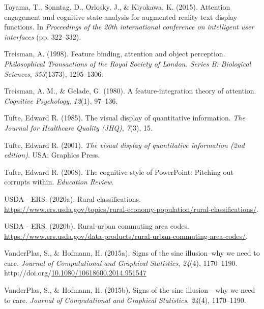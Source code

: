 \documentclass[print]{nuthesis}
\newlength{\cslhangindent}
\newenvironment{CSLReferences}[2]%
{\setlength{\parindent}{0pt}%
\everypar{\setlength{\hangindent}{\cslhangindent}}\ignorespaces}%
{\par}
\begin{document}
\begin{CSLReferences}{1}{0}
\leavevmode{}%
Toyama, T., Sonntag, D., Orlosky, J., \& Kiyokawa, K. (2015). Attention engagement and cognitive state analysis for augmented reality text display functions. In \emph{Proceedings of the 20th international conference on intelligent user interfaces} (pp. 322--332).

\leavevmode{}%
Treisman, A. (1998). Feature binding, attention and object perception. \emph{Philosophical Transactions of the Royal Society of London. Series B: Biological Sciences}, \emph{353}(1373), 1295--1306.

\leavevmode{}%
Treisman, A. M., \& Gelade, G. (1980). A feature-integration theory of attention. \emph{Cognitive Psychology}, \emph{12}(1), 97--136.

\leavevmode{}%
Tufte, Edward R. (1985). The visual display of quantitative information. \emph{The Journal for Healthcare Quality (JHQ)}, \emph{7}(3), 15.

\leavevmode{}%
Tufte, Edward R. (2001). \emph{The visual display of quantitative information (2nd edition)}. USA: Graphics Press.

\leavevmode{}%
Tufte, Edward R. (2008). The cognitive style of PowerPoint: Pitching out corrupts within. \emph{Education Review}.

\leavevmode{}%
USDA - ERS. (2020a). Rural classifications. \url{https://www.ers.usda.gov/topics/rural-economy-population/rural-classifications/}.

\leavevmode{}%
USDA - ERS. (2020b). Rural-urban commuting area codes. \url{https://www.ers.usda.gov/data-products/rural-urban-commuting-area-codes/}.

\leavevmode{}%
VanderPlas, S., \& Hofmann, H. (2015a). Signs of the sine illusion--why we need to care. \emph{Journal of Computational and Graphical Statistics}, \emph{24}(4), 1170--1190. http://doi.org/\href{https://doi.org/10.1080/10618600.2014.951547}{10.1080/10618600.2014.951547}

\leavevmode{}%
VanderPlas, S., \& Hofmann, H. (2015b). Signs of the sine illusion---why we need to care. \emph{Journal of Computational and Graphical Statistics}, \emph{24}(4), 1170--1190.


\end{CSLReferences}
\end{document}
